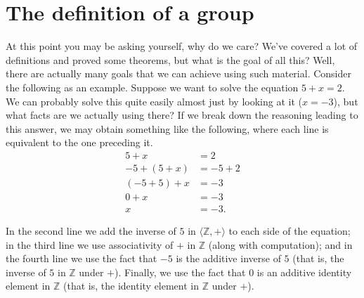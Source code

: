 \documentclass[10pt,]{book}
\theoremstyle{plain}
\theoremstyle{definition}
\theoremstyle{definition}
\theoremstyle{definition}
\theoremstyle{definition}
\numberwithin{equation}{section}
\def\Z{\mathbb{Z}}
\newcommand{\amp}{ & }
\begin{document}
\typeout{************************************************}
\typeout{************************************************}
\section[{The definition of a group}]{The definition of a group}\label{section-5}

    At this point you may be asking yourself, why do we care? We've covered a lot of definitions and proved some theorems, but what is the goal of all this? Well, there are actually many goals that we can achieve using such material. Consider the following as an example. Suppose we want to solve the equation \(5+x=2\). We can probably solve this quite easily almost just by looking at it (\(x=-3\)), but what facts are we actually using there? If we break down the reasoning leading to this answer, we may obtain something like the following, where each line is equivalent to the one preceding it.
%
\begin{align*}
5+x\amp =2 \\
-5+(5+x)\amp =-5+2\\
(-5+5)+x \amp =-3\\
0+x\amp =-3\\
x\amp =-3.
\end{align*}
\par

    In the second line we add the inverse of \(5\) in \(\langle \Z, +\rangle\) to each side of
    the equation; in the third line we use associativity of \(+\) in \(\Z\) (along
    with computation); and in the fourth line we use the fact that \(-5\) is the
    additive inverse of \(5\) (that is, the inverse of \(5\) in \(\Z\) under
    \(+\)). Finally, we use the fact that 0 is an additive
    identity element in \(\Z\) (that is, the identity element in \(\Z\)
    under \(+\)).
\par
\end{document}
